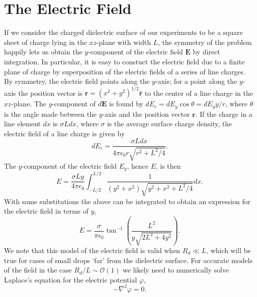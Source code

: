 \documentclass[12pt,a4paper,oneside]{book}
\begin{document}
\section{The Electric Field}
If we consider the charged dielectric surface of our experiments to be a square sheet of charge lying in the $xz$-plane with width $L$, the symmetry of the problem happily lets us obtain the $y$-component of the electric field $\mathbf{E}$ by direct integration. In particular, it is easy to constuct the electric field due to a finite plane of charge by superposition of the electric fields of a series of line charges. By symmetry, the electric field points along the $y$-axis; for a point along the $y$-axis the position vector is $\mathbf{r} = \left( x^2 + y^2 \right)^{1/2} \hat{\mathbf{r}}$ to the center of a line charge in the $xz$-plane. The $y$-component of $d\mathbf{E}$ is found by $d E_r = d E_y \cos \theta = d E_y y/ r$, where $\theta$ is the angle made between the $y$-axis and the position vector $\mathbf{r}$. If the charge in a line element $dx$ is $\sigma L dx$, where $\sigma$ is the average surface charge density, the electric field of a line charge is given by \cite{david_j._griffiths_introduction_1999}
\[d E_r = \frac{\sigma L dx}{4 \pi \epsilon_0 r \sqrt{r^2 + L^2/4}}.
\]
The $y$-component of the electric field $E_y$, hence $E$, is then
\[ E = \frac{\sigma L y }{4 \pi \epsilon_0} \int^{L/2}_{-L/2} \frac{1}{(y^2 + x^2) \sqrt{y^2 + x^2 + L^2/4}} dx 
.\]
With some substitutions the above can be integrated to obtain an expression for the electric field in terms of $y$, 
\begin{equation}
\label{e_field}
E = \frac{\sigma}{ \pi \epsilon_0} \tan^{-1} \left( \frac{L^2}{y \sqrt{2L^2 + 4y^2}}\right)
.\end{equation}
We note that this model of the electric field is valid when $R_d \ll L$, which will be true for cases of small drops `far' from the dielectric surface. For accurate models of the field in the case $R_d/L \sim \mathcal{O}(1)$ we likely need to numerically solve Laplace's equation for the electric potential $\varphi$,
\[ - \nabla^2 \varphi = 0.\]
\end{document}
